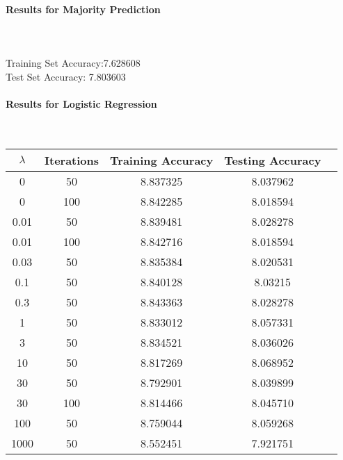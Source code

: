 \documentclass[10pt]{article}
\begin{document}
\paragraph{Results for Majority Prediction}\\
\\Training Set Accuracy:7.628608 
\\Test Set Accuracy: 7.803603
\\\paragraph{Results for Logistic Regression}\\
\begin{center}
 \begin{tabular}{|c | c | c | c | c||} 
 \hline
$\lambda$ &Iterations & Training Accuracy & Testing Accuracy\\ [0.5ex] 
 \hline\hline
0 & 50 & 8.837325 & 8.037962\\ 
 \hline
0 & 100 & 8.842285 & 8.018594\\ 
 \hline
0.01 & 50 & 8.839481 & 8.028278\\  
 \hline
0.01 & 100 & 8.842716 & 8.018594\\ 
 \hline
0.03 & 50 & 8.835384 & 8.020531\\ 
 \hline
0.1 & 50 & 8.840128 & 8.03215\\
 \hline
0.3 & 50 & 8.843363 & 8.028278\\ 
 \hline
1 & 50 & 8.833012 & 8.057331\\  
 \hline
3 & 50 & 8.834521 & 8.036026\\  
 \hline
10 & 50 & 8.817269 & 8.068952\\  
 \hline
30 & 50 & 8.792901 & 8.039899\\  
 \hline
30 & 100 & 8.814466 & 8.045710\\  
 \hline
100 & 50 & 8.759044 & 8.059268\\  
 \hline
1000 & 50 & 8.552451 & 7.921751\\  
 \hline
\end{tabular}
\end{center}
\end{document}
